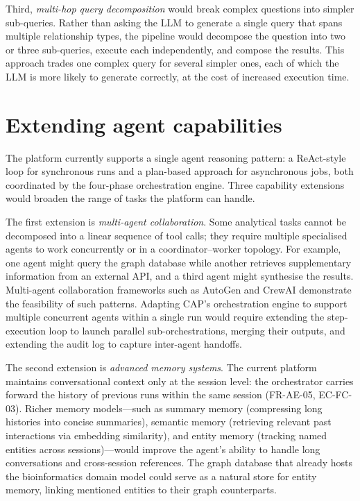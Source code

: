 \documentclass[a4paper]{sapthesis}
\begin{document}
Third, \emph{multi-hop query decomposition} would break complex questions
into simpler sub-queries.  Rather than asking the LLM to generate a single
query that spans multiple relationship types, the pipeline would decompose
the question into two or three sub-queries, execute each independently,
and compose the results.  This approach trades one complex query for
several simpler ones, each of which the LLM is more likely to generate
correctly, at the cost of increased execution time.

\section{Extending agent capabilities}
\label{sec:fw-agent}

The platform currently supports a single agent reasoning pattern:
a ReAct-style loop for synchronous runs and a plan-based approach for
asynchronous jobs, both coordinated by the four-phase orchestration
engine.  Three capability extensions would broaden the range of tasks the
platform can handle.

The first extension is \emph{multi-agent collaboration}.  Some analytical
tasks cannot be decomposed into a linear sequence of tool calls; they
require multiple specialised agents to work concurrently or in a
coordinator--worker topology.  For example, one agent might query the graph
database while another retrieves supplementary information from an
external API, and a third agent might synthesise the results.
Multi-agent collaboration frameworks such as AutoGen and CrewAI
demonstrate the feasibility of such patterns.  Adapting CAP's
orchestration engine to support multiple concurrent agents within
a single run would require extending the step-execution loop to launch
parallel sub-orchestrations, merging their outputs, and extending the
audit log to capture inter-agent handoffs.

The second extension is \emph{advanced memory systems}.  The current
platform maintains conversational context only at the session level:
the orchestrator carries forward the history of previous runs within
the same session (FR-AE-05, EC-FC-03).  Richer memory models---such as
summary memory (compressing long histories into concise summaries),
semantic memory (retrieving relevant past interactions via embedding
similarity), and entity memory (tracking named entities across
sessions)---would improve the agent's ability to handle long
conversations and cross-session references.  The graph database that
already hosts the bioinformatics domain model could serve as a natural
store for entity memory, linking mentioned entities to their graph
counterparts.
\end{document}
